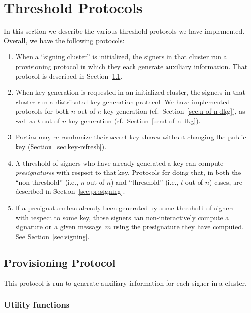 \documentclass[11pt]{article}
\newcommand{\?}[1]{\stackrel{?}{#1}}
\begin{document}
\section{Threshold Protocols}

In this section we describe the various threshold protocols we have implemented. 
Overall, we have the following protocols:
\begin{enumerate}
    \item When a ``signing cluster'' is initialized, the signers in that cluster run a provisioning protocol in which they each generate auxiliary information. That protocol is described in Section~\ref{section:aux_data_gen}. 

    \item When key generation is requested in an initialized cluster, the signers in that cluster run a distributed key-generation protocol. 
    We have implemented protocols for both $n$-out-of-$n$ key generation (cf.\ Section~\ref{sec:n-of-n-dkg}), as well as $t$-out-of-$n$ key  generation (cf.\ Section~\ref{sec:t-of-n-dkg}).

    \item Parties may re-randomize their secret key-shares without changing the public key (Section~\ref{sec:key-refresh}).

    \item A threshold of signers who have already generated a key can compute \emph{presignatures} with respect to that key. Protocols for doing that, in both the ``non-threshold'' (i.e., $n$-out-of-$n$) and ``threshold'' (i.e., $t$-out-of-$n$) cases, are described in Section~\ref{sec:presigning}.

    \item If a presignature has already been generated by some threshold of signers with respect to some key, those signers can non-interactively compute a signature on a given message~$m$ using the presignature they have computed. See Section~\ref{sec:signing}.
\end{enumerate}

\subsection{Provisioning Protocol}
\label{section:aux_data_gen}

This protocol is run to generate auxiliary information for each signer in a cluster.  

\subsubsection{Utility functions}
\end{document}
